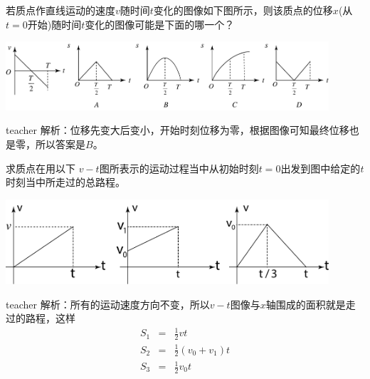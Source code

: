 \begin{example}
若质点作直线运动的速度$v$随时间$t$变化的图像如下图所示，则该质点的位移$x$(从$t=0$开始)随时间$t$变化的图像可能是下面的哪一个？
\begin{center}
\includegraphics[width=0.9\textwidth]{images/motion-problem-39.pdf}

\end{center}
\begin{taggedblock}{teacher}
\noindent
解析：位移先变大后变小，开始时刻位移为零，根据图像可知最终位移也是零，所以答案是$B$。
\end{taggedblock}
\end{example}

\begin{example}
求质点在用以下 $v-t$图所表示的运动过程当中从初始时刻$t=0$出发到图中给定的$t$时刻当中所走过的总路程。
\begin{center}
\includegraphics[width = 0.9\textwidth]{images/motion-problem-6.pdf}
\end{center}

\begin{taggedblock}{teacher}
\noindent
解析：所有的运动速度方向不变，所以$v-t$图像与$x$轴围成的面积就是走过的路程，这样
\begin{eqnarray*}
S_1 &=& \frac{1}{2}vt\\
S_2 &=& \frac{1}{2}(v_0+v_1)t\\
S_3&=& \frac{1}{2}v_0t
\end{eqnarray*}

\end{taggedblock}
\end{example}





